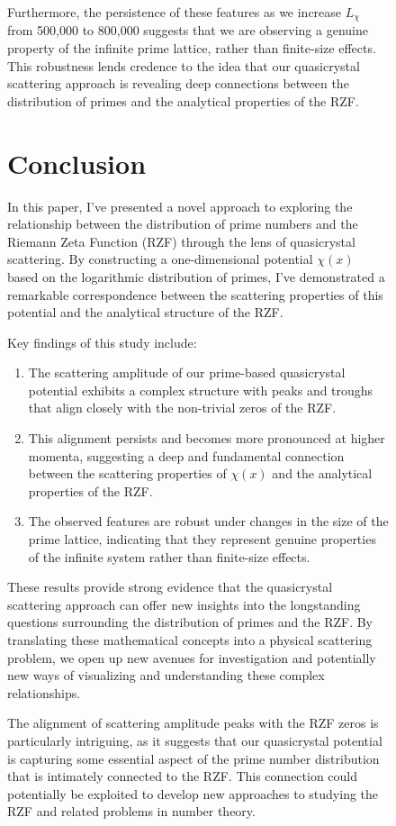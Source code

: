 \documentclass[11pt, oneside]{article}
\begin{document}
\begin{figure}[htbp]
\begin{center}
Furthermore, the persistence of these features as we increase $L_\chi$ from 500,000 to 800,000 suggests that we are observing a genuine property of the infinite prime lattice, rather than finite-size effects. This robustness lends credence to the idea that our quasicrystal scattering approach is revealing deep connections between the distribution of primes and the analytical properties of the RZF.

\section{Conclusion}

In this paper, I've presented a novel approach to exploring the relationship between the distribution of prime numbers and the Riemann Zeta Function (RZF) through the lens of quasicrystal scattering. By constructing a one-dimensional potential $\chi(x)$ based on the logarithmic distribution of primes, I've demonstrated a remarkable correspondence between the scattering properties of this potential and the analytical structure of the RZF.

Key findings of this study include:

\begin{enumerate}
    \item The scattering amplitude of our prime-based quasicrystal potential exhibits a complex structure with peaks and troughs that align closely with the non-trivial zeros of the RZF.
    \item This alignment persists and becomes more pronounced at higher momenta, suggesting a deep and fundamental connection between the scattering properties of $\chi(x)$ and the analytical properties of the RZF.
    \item The observed features are robust under changes in the size of the prime lattice, indicating that they represent genuine properties of the infinite system rather than finite-size effects.
\end{enumerate}

These results provide strong evidence that the quasicrystal scattering approach can offer new insights into the longstanding questions surrounding the distribution of primes and the RZF. By translating these mathematical concepts into a physical scattering problem, we open up new avenues for investigation and potentially new ways of visualizing and understanding these complex relationships.

The alignment of scattering amplitude peaks with the RZF zeros is particularly intriguing, as it suggests that our quasicrystal potential is capturing some essential aspect of the prime number distribution that is intimately connected to the RZF. This connection could potentially be exploited to develop new approaches to studying the RZF and related problems in number theory.


\end{center}
\end{figure}
\end{document}
